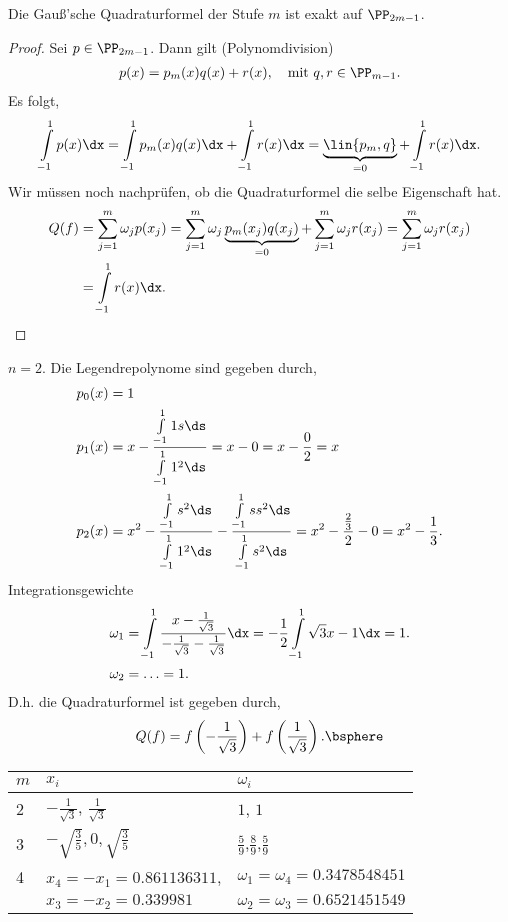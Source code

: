 \begin{prop}
\label{prop:4.8}
Die Gauß'sche Quadraturformel der Stufe $m$ ist exakt auf $\PP_{2m-1}$.\fishhere 
\end{prop}
\begin{proof}
Sei $p\in\PP_{2m-1}$. Dann gilt (Polynomdivision)
\begin{align*}
p(x) = p_m(x)q(x) + r(x),\quad\text{mit } q,r\in\PP_{m-1}.
\end{align*}
Es folgt,
\begin{align*}
\int\limits_{-1}^1 p(x)\dx = \int\limits_{-1}^1 p_m(x)q(x)\dx +
\int\limits_{-1}^1 r(x)\dx =
\underbrace{\lin{p_m,q}}_{=0} +  \int\limits_{-1}^1 r(x)\dx.
\end{align*}
Wir müssen noch nachprüfen, ob die Quadraturformel die selbe Eigenschaft hat.
\begin{align*}
Q(f) &= \sum\limits_{j=1}^m \omega_j p(x_j) = \sum\limits_{j=1}^m \omega_j
\underbrace{p_m(x_j)q(x_j)}_{=0} + \sum\limits_{j=1}^m \omega_j r(x_j) =
\sum\limits_{j=1}^m \omega_j r(x_j) \\ &= \int\limits_{-1}^1 r(x)\dx.\qedhere  
\end{align*}
\end{proof}

\begin{bspn}
$n=2$. Die Legendrepolynome sind gegeben durch,
\begin{align*}
&p_0(x) = 1\\
&p_1(x) = x-\frac{\int\limits_{-1}^1 1 s\ds}{\int\limits_{-1}^1 1^2\ds} = x-
0 = x-\frac{0}{2} = x\\
&p_2(x) = x^2 - \frac{\int\limits_{-1}^1 s^2\ds}{\int\limits_{-1}^1 1^2\ds}
- \frac{\int\limits_{-1}^1 s s^2\ds}{\int\limits_{-1}^1 s^2\ds}
= x^2 - \frac{\frac{2}{3}}{2} - 0 = x^2 - \frac{1}{3}.
\end{align*}
Integrationsgewichte
\begin{align*}
&\omega_1 = \int\limits_{-1}^1
\frac{x-\frac{1}{\sqrt{3}}}{-\frac{1}{\sqrt{3}}-\frac{1}{\sqrt{3}}}\dx =
-\frac{1}{2}\int\limits_{-1}^1 \sqrt{3}x-1\dx =  1.\\
&\omega_2 = \ldots = 1. 
\end{align*}
D.h. die Quadraturformel ist gegeben durch,
\begin{align*}
Q(f) = f\left(-\frac{1}{\sqrt{3}}\right) +
f\left(\frac{1}{\sqrt{3}}\right).\bsphere
\end{align*}
\end{bspn}

\begin{tabular}[h]{l|l|l}
$m$ & $x_i$ & $\omega_i$\\\hline
2 & $-\frac{1}{\sqrt{3}}$, $\frac{1}{\sqrt{3}}$ & $1$, $1$\\
3 & $-\sqrt{\frac{3}{5}}, 0, \sqrt{\frac{3}{5}}$ &
$\frac{5}{9}$,$\frac{8}{9}$,$\frac{5}{9}$\\
4 & $x_4 = -x_1 = 0.861136311$,  & $\omega_1=\omega_4 =
0.3478548451$\\
& $x_3=-x_2 = 0.339981$ & $\omega_2 = \omega_3 = 0.6521451549$ 
\end{tabular}

